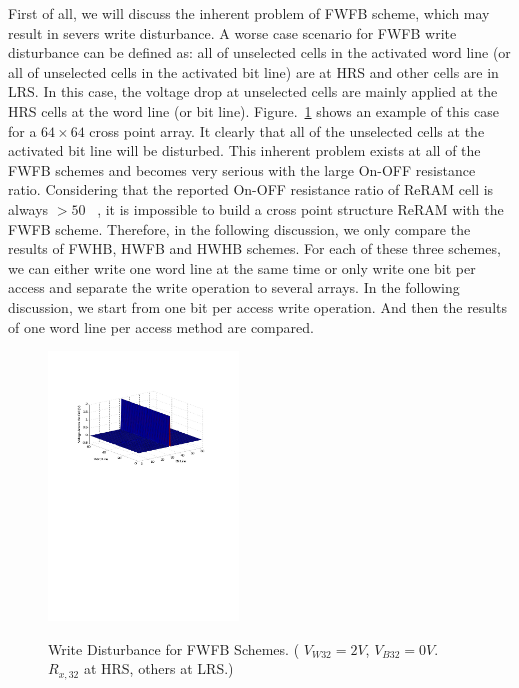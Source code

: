 First of all, we will discuss the inherent problem of FWFB scheme, which
may result in severs write disturbance. A worse case scenario for FWFB
write disturbance can be defined as: all of unselected cells in the
activated word line (or all of unselected cells in the activated bit line)
are at HRS and other cells are in LRS. In this case, the voltage drop at
unselected cells are mainly applied at the HRS cells at the word line (or
bit line). Figure.~\ref{fig:FWFR} shows an example of this case for a $64
\times 64$ cross point array. It clearly that all of the unselected cells
at the activated bit line will be disturbed. This inherent problem exists
at all of the FWFB schemes and becomes very serious with the large On-OFF
resistance ratio. Considering that the reported On-OFF resistance ratio of
ReRAM cell is always $>50$
~\cite{ReRAM_IEDM2010_Ho,ReRAM_IEDM2010_Chien,ReRAM_IEDM2010_Lee_Diode,ReRAM_IEDM2010_Lee_Evidence,ReRAM_ISSCC2011_Sheu,ReRAM_ISSCC2011_Otsuka},
it is impossible to build a cross point structure ReRAM with the FWFB
scheme. Therefore, in the following discussion, we only compare the
results of FWHB, HWFB and HWHB schemes. For each of these three schemes,
we can either write one word line at the same time or only write one bit
per access and separate the write operation to several arrays. In the
following discussion, we start from one bit per access write operation.
And then the results of one word line per access method are compared.

\begin{figure}%
\centering
  \includegraphics[width=0.45\textwidth]{./figures/FWFB2.pdf}\\
  \caption{Write Disturbance for FWFB Schemes. ( $V_{W32} = 2V$, $V_{B32} = 0V$. $R_{x,32}$ at HRS, others at LRS.) }\label{fig:FWFR}
\end{figure}

